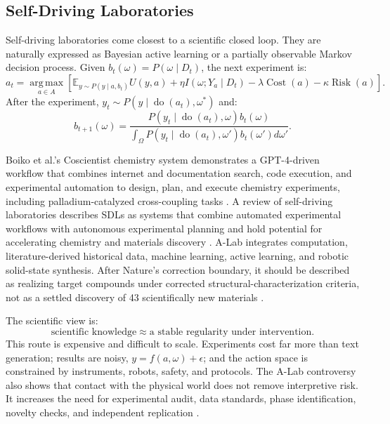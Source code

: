 \documentclass[11pt,a4paper]{article}
\newcommand{\E}{\mathbb{E}}
\newcommand{\doop}{\operatorname{do}}
\newcommand{\argmax}{\operatorname*{arg\,max}}
\newcommand{\Cost}{\operatorname{Cost}}
\newcommand{\Risk}{\operatorname{Risk}}
\begin{document}
\subsection{Self-Driving Laboratories}

Self-driving laboratories come closest to a scientific closed loop. They are naturally expressed as Bayesian active learning or a partially observable Markov decision process. Given $b_t(\omega)=P(\omega\mid D_t)$, the next experiment is:
\begin{equation}
a_t=\argmax_{a\in A}
\left[
\E_{y\sim P(y\mid a,b_t)}U(y,a)
+\eta I(\omega;Y_a\mid D_t)
-\lambda \Cost(a)
-\kappa \Risk(a)
\right].
\end{equation}
After the experiment, $y_t\sim P(y\mid \doop(a_t),\omega^\ast)$ and:
\begin{equation}
b_{t+1}(\omega)=
\frac{P(y_t\mid \doop(a_t),\omega)b_t(\omega)}
{\int_{\Omega}P(y_t\mid \doop(a_t),\omega')b_t(\omega')d\omega'}.
\end{equation}

Boiko et al.'s Coscientist chemistry system demonstrates a GPT-4-driven workflow that combines internet and documentation search, code execution, and experimental automation to design, plan, and execute chemistry experiments, including palladium-catalyzed cross-coupling tasks \citep{Boiko2023Coscientist}. A review of self-driving laboratories describes SDLs as systems that combine automated experimental workflows with autonomous experimental planning and hold potential for accelerating chemistry and materials discovery \citep{Tom2024SDL}. A-Lab integrates computation, literature-derived historical data, machine learning, active learning, and robotic solid-state synthesis. After Nature's correction boundary, it should be described as realizing target compounds under corrected structural-characterization criteria, not as a settled discovery of 43 scientifically new materials \citep{Szymanski2023ALab,Szymanski2026ALabCorrection}.

The scientific view is:
\[
\boxed{\text{scientific knowledge} \approx \text{a stable regularity under intervention}.}
\]
This route is expensive and difficult to scale. Experiments cost far more than text generation; results are noisy, $y=f(a,\omega)+\epsilon$; and the action space is constrained by instruments, robots, safety, and protocols. The A-Lab controversy also shows that contact with the physical world does not remove interpretive risk. It increases the need for experimental audit, data standards, phase identification, novelty checks, and independent replication \citep{Chawla2026ALabCorrection}.
\end{document}
